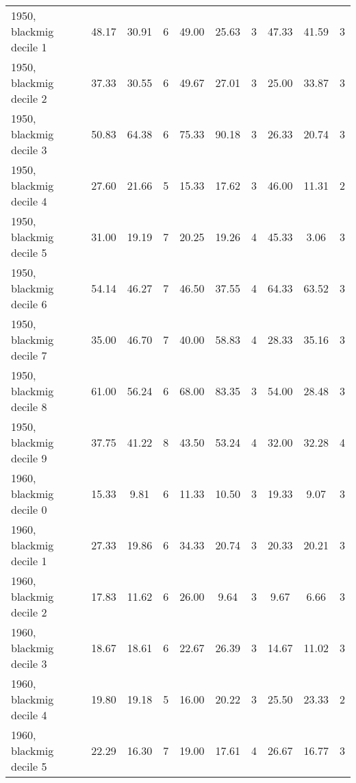 \begin{table}[htbp]
\begin{tabular}{l*{3}{ccc}}
1950, blackmig decile 1&       48.17&       30.91&           6&       49.00&       25.63&           3&       47.33&       41.59&           3\\
1950, blackmig decile 2&       37.33&       30.55&           6&       49.67&       27.01&           3&       25.00&       33.87&           3\\
1950, blackmig decile 3&       50.83&       64.38&           6&       75.33&       90.18&           3&       26.33&       20.74&           3\\
1950, blackmig decile 4&       27.60&       21.66&           5&       15.33&       17.62&           3&       46.00&       11.31&           2\\
1950, blackmig decile 5&       31.00&       19.19&           7&       20.25&       19.26&           4&       45.33&        3.06&           3\\
1950, blackmig decile 6&       54.14&       46.27&           7&       46.50&       37.55&           4&       64.33&       63.52&           3\\
1950, blackmig decile 7&       35.00&       46.70&           7&       40.00&       58.83&           4&       28.33&       35.16&           3\\
1950, blackmig decile 8&       61.00&       56.24&           6&       68.00&       83.35&           3&       54.00&       28.48&           3\\
1950, blackmig decile 9&       37.75&       41.22&           8&       43.50&       53.24&           4&       32.00&       32.28&           4\\
1960, blackmig decile 0&       15.33&        9.81&           6&       11.33&       10.50&           3&       19.33&        9.07&           3\\
1960, blackmig decile 1&       27.33&       19.86&           6&       34.33&       20.74&           3&       20.33&       20.21&           3\\
1960, blackmig decile 2&       17.83&       11.62&           6&       26.00&        9.64&           3&        9.67&        6.66&           3\\
1960, blackmig decile 3&       18.67&       18.61&           6&       22.67&       26.39&           3&       14.67&       11.02&           3\\
1960, blackmig decile 4&       19.80&       19.18&           5&       16.00&       20.22&           3&       25.50&       23.33&           2\\
1960, blackmig decile 5&       22.29&       16.30&           7&       19.00&       17.61&           4&       26.67&       16.77&           3\\

\end{tabular}
\end{table}
